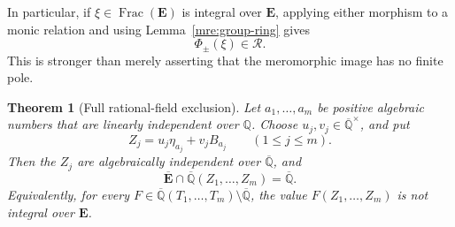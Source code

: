 \documentclass[11pt]{article}
\newtheorem{theorem}{Theorem}[section]
\theoremstyle{definition}
\theoremstyle{remark}
\newcommand{\Qa}{\overline{\mathbb Q}}
\newcommand{\E}{\mathbf E}
\newcommand{\Ebar}{\overline{\mathbf E}}
\begin{document}
In particular, if $\xi\in\operatorname{Frac}(\E)$ is integral over
$\E$, applying either morphism to a monic relation and using
Lemma~\ref{mre:group-ring} gives
\begin{equation}\label{mre:integral-image}
 \Phi_\pm(\xi)\in\mathcal R.
\end{equation}
This is stronger than merely asserting that the meromorphic image has
no finite pole.

\begin{theorem}[Full rational-field exclusion]
\label{mre:main}
Let $a_1,\ldots,a_m$ be positive algebraic numbers that are linearly
independent over $\mathbb Q$. Choose
$u_j,v_j\in\Qa^\times$, and put
\[
 Z_j=u_j\eta_{a_j}+v_jB_{a_j}\qquad(1\le j\le m).
\]
Then the $Z_j$ are algebraically independent over $\Qa$, and
\begin{equation}\label{mre:main-equation}
 \Ebar\cap\Qa(Z_1,\ldots,Z_m)=\Qa.
\end{equation}
Equivalently, for every
$F\in\Qa(T_1,\ldots,T_m)\setminus\Qa$, the value
$F(Z_1,\ldots,Z_m)$ is not integral over $\E$.
\end{theorem}
\end{document}
